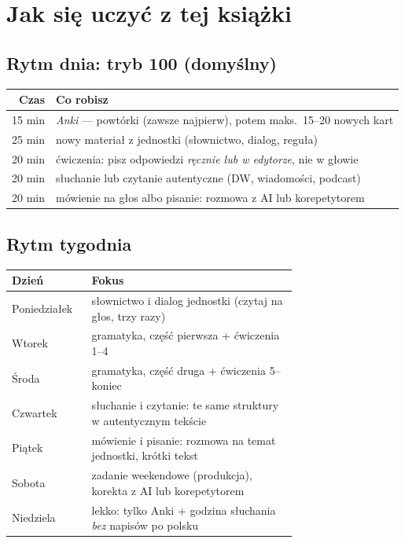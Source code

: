 \chapter*{Jak się uczyć z tej książki}

\section*{Rytm dnia: tryb 100 (domyślny)}

\begin{center}
\begin{tabular}{@{}rl@{}}
\toprule
\textsf{\textbf{Czas}} & \textsf{\textbf{Co robisz}}\\
\midrule
15 min & \emph{Anki} --- powtórki (zawsze najpierw), potem maks.\ 15--20 nowych kart\\
25 min & nowy materiał z jednostki (słownictwo, dialog, reguła)\\
20 min & ćwiczenia: pisz odpowiedzi \emph{ręcznie lub w edytorze}, nie w głowie\\
20 min & słuchanie lub czytanie autentyczne (DW, wiadomości, podcast)\\
20 min & mówienie na głos albo pisanie: rozmowa z AI lub korepetytorem\\
\bottomrule
\end{tabular}
\end{center}

\section*{Rytm tygodnia}

\begin{center}
\begin{tabular}{@{}lp{0.72\linewidth}@{}}
\toprule
\textsf{\textbf{Dzień}} & \textsf{\textbf{Fokus}}\\
\midrule
Poniedziałek & słownictwo i dialog jednostki (czytaj na głos, trzy razy)\\
Wtorek & gramatyka, część pierwsza + ćwiczenia 1--4\\
Środa & gramatyka, część druga + ćwiczenia 5--koniec\\
Czwartek & słuchanie i czytanie: te same struktury w autentycznym tekście\\
Piątek & mówienie i pisanie: rozmowa na temat jednostki, krótki tekst\\
Sobota & zadanie weekendowe (produkcja), korekta z AI lub korepetytorem\\
Niedziela & lekko: tylko Anki + godzina słuchania \emph{bez} napisów po polsku\\
\bottomrule
\end{tabular}
\end{center}

